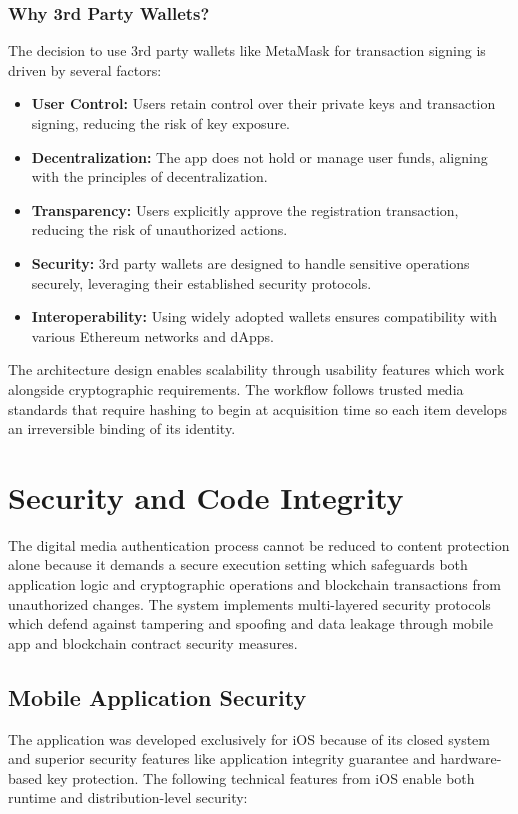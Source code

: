 \subsubsection{Why 3rd Party Wallets?}
The decision to use 3rd party wallets like MetaMask for transaction signing is driven by several factors:
\begin{itemize}
    \item {\textbf{User Control:}} Users retain control over their private keys and transaction signing, reducing the risk of key exposure.
    \item {\textbf{Decentralization:}} The app does not hold or manage user funds, aligning with the principles of decentralization.
    \item {\textbf{Transparency:}} Users explicitly approve the registration transaction, reducing the risk of unauthorized actions.
    \item {\textbf{Security:}} 3rd party wallets are designed to handle sensitive operations securely, leveraging their established security protocols.
    \item {\textbf{Interoperability:}} Using widely adopted wallets ensures compatibility with various Ethereum networks and dApps.
\end{itemize}

The architecture design enables scalability through usability features which work alongside cryptographic requirements. The workflow follows trusted media standards \cite{harran2017} that require hashing to begin at acquisition time so each item develops an irreversible binding of its identity.


\section{Security and Code Integrity}
The digital media authentication process cannot be reduced to content protection alone because it demands a secure execution setting which safeguards both application logic and cryptographic operations and blockchain transactions from unauthorized changes. 
The system implements multi-layered security protocols which defend against tampering and spoofing and data leakage through mobile app and blockchain contract security measures.

\subsection{Mobile Application Security}
The application was developed exclusively for iOS because of its closed system and superior security features like application integrity guarantee and hardware-based key protection. 
The following technical features from iOS enable both runtime and distribution-level security:

